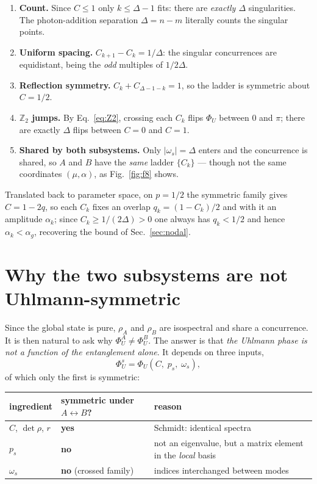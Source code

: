 \documentclass[11pt]{article}
\begin{document}
\begin{enumerate}[label=(\arabic*),nosep]
\item \textbf{Count.} Since $C\le1$ only $k\le\Delta-1$ fits: there are
      \emph{exactly $\Delta$} singularities. The photon-addition separation
      $\Delta=n-m$ literally counts the singular points.
\item \textbf{Uniform spacing.} $C_{k+1}-C_k=1/\Delta$: the singular
      concurrences are equidistant, being the \emph{odd} multiples of
      $1/2\Delta$.
\item \textbf{Reflection symmetry.} $C_k+C_{\Delta-1-k}=1$, so the ladder is
      symmetric about $C=1/2$.
\item \textbf{$\mathbb{Z}_2$ jumps.} By Eq.~\eqref{eq:Z2}, crossing each $C_k$
      flips $\Phi_U$ between $0$ and $\pi$; there are exactly $\Delta$ flips
      between $C=0$ and $C=1$.
\item \textbf{Shared by both subsystems.} Only $|\omega_s|=\Delta$ enters and
      the concurrence is shared, so $A$ and $B$ have the \emph{same} ladder
      $\{C_k\}$ --- though not the same coordinates $(\mu,\alpha)$, as
      Fig.~\ref{fig:f8} shows.
\end{enumerate}

Translated back to parameter space, on $p=1/2$ the symmetric family gives
$C=1-2q$, so each $C_k$ fixes an overlap $q_k=(1-C_k)/2$ and with it an
amplitude $\alpha_k$; since $C_k\ge1/(2\Delta)>0$ one always has $q_k<1/2$ and
hence $\alpha_k<\alpha_g$, recovering the bound of Sec.~\ref{sec:nodal}.

\section{Why the two subsystems are not Uhlmann-symmetric}
\label{sec:asymmetry}

Since the global state is pure, $\rho_A$ and $\rho_B$ are isospectral and share
a concurrence. It is then natural to ask why $\Phi_U^A\neq\Phi_U^B$. The answer
is that \emph{the Uhlmann phase is not a function of the entanglement alone}.
It depends on three inputs,
\begin{equation}
\Phi_U^s=\Phi_U(C,\;p_s,\;\omega_s),
\end{equation}
of which only the first is symmetric:

\begin{center}
\begin{tabular}{lll}
\toprule
ingredient & symmetric under $A\leftrightarrow B$? & reason\\
\midrule
$C$, $\det\rho$, $r$ & \textbf{yes} & Schmidt: identical spectra\\
$p_s$ & \textbf{no} & not an eigenvalue, but a matrix element in the \emph{local} basis\\
$\omega_s$ & \textbf{no} (crossed family) & indices interchanged between modes\\
\bottomrule
\end{tabular}
\end{center}
\end{document}
